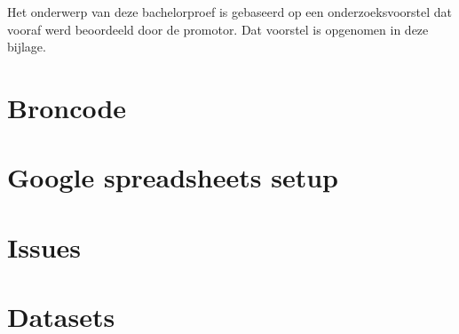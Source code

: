 \documentclass[fleqn,a4paper,12pt]{book}
\begin{document}
Het onderwerp van deze bachelorproef is gebaseerd op een onderzoeksvoorstel dat vooraf werd beoordeeld door de promotor. Dat voorstel is opgenomen in deze bijlage.



%
\chapter{Broncode}






\chapter{Google spreadsheets setup}


\chapter{Issues}

\chapter{Datasets}


\printbibliography[heading=bibintoc]
\end{document}
